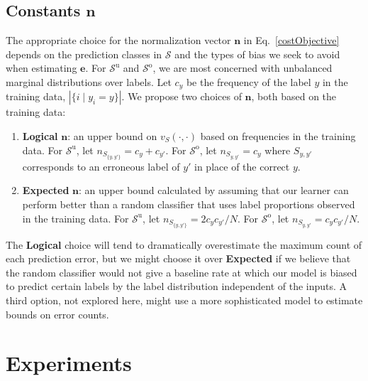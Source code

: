 \documentclass{article} %
\newcommand{\unorderedS}{\mathcal{S}^{\mathrm{u}}}
\newcommand{\orderedS}{\mathcal{S}^{\mathrm{o}}}
\begin{document}
\subsection{Constants $\mathbf{n}$}

The appropriate choice for the normalization vector $\mathbf{n}$ in 
Eq.~\ref{costObjective} depends on the prediction classes in
$\mathcal{S}$ and the types of bias we seek to avoid when estimating $\mathbf{e}$.
For $\unorderedS$ and $\orderedS$, we are most concerned with
unbalanced marginal distributions over labels.  
Let $c_y$ be the frequency of the label $y$ in the training data,
$|\{i \mid y_i = y\}|$.
We propose two choices
of $\mathbf{n}$, both based on the training data:
\begin{enumerate}
\item \textbf{Logical} $\mathbf{n}$:  an upper bound on $v_S(\cdot,
  \cdot)$ based on frequencies in the training data.  For $\unorderedS$, let
  $n_{S_{\{y,y'\}}} = c_y+c_{y'}$.  For
  $\orderedS$, let $n_{S_{y, y'}} = c_y$ where
  $S_{y,y'}$ corresponds to an erroneous label of $y'$ in place of the
  correct $y$.
\item \textbf{Expected} $\mathbf{n}$:  an upper bound calculated by
  assuming that our learner can perform better than a random
  classifier that uses label proportions observed in the training
  data.    For $\unorderedS$, let $n_{S_{\{y,y'\}}} = 2c_y c_{y'} / N$.  For
  $\orderedS$, let $n_{S_{y,y'}} =  c_y c_{y'} / N$. 
\end{enumerate}

 The \textbf{Logical} choice
will tend to dramatically overestimate the maximum count of each
prediction error,
but we might choose it over \textbf{Expected} if we
believe that the random classifier would not give a baseline rate at
which our model is biased to predict certain labels by the label
distribution independent of the inputs.
A third option, not explored here, might use a more sophisticated
model to estimate bounds on error counts.

\section{Experiments}
\end{document}
